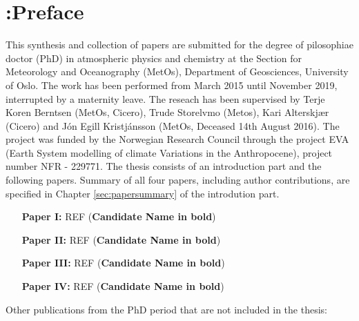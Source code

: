 \chapter*{{\color{red} :}Preface}
%
%
This synthesis and collection of papers are submitted for the degree of pilosophiae doctor (PhD) in atmospheric physics and chemistry at the Section for Meteorology and Oceanography (MetOs), Department of Geosciences, University of Oslo. The work has been performed from March 2015 until November 2019, interrupted by a maternity leave. The reseach has been supervised by Terje Koren Berntsen (MetOs, Cicero), Trude Storelvmo (Metos), Kari Alterskjær (Cicero) and J\'{o}n Egill Kristj\'{a}nsson (MetOs, Deceased 14th August 2016). The project was funded by the Norwegian Research Council through the project EVA (Earth System modelling of climate Variations in the Anthropocene), project number NFR - 229771. The thesis consists of an introduction part and the following papers. Summary of all four papers, including author contributions, are specified in Chapter \ref{sec:papersummary} of the introdution part.\\

\begin{enumerate}
\item[\textbf{Paper I:}] REF (\textbf{Candidate Name in bold})

\item[\textbf{Paper II:}] REF (\textbf{Candidate Name in bold})

\item[\textbf{Paper III:}]  REF (\textbf{Candidate Name in bold})

\item[\textbf{Paper IV:}] REF (\textbf{Candidate Name in bold})
\end{enumerate}



%
%
\vskip1.0cm
Other publications from the PhD period that are not included in the thesis:
\smallskip

